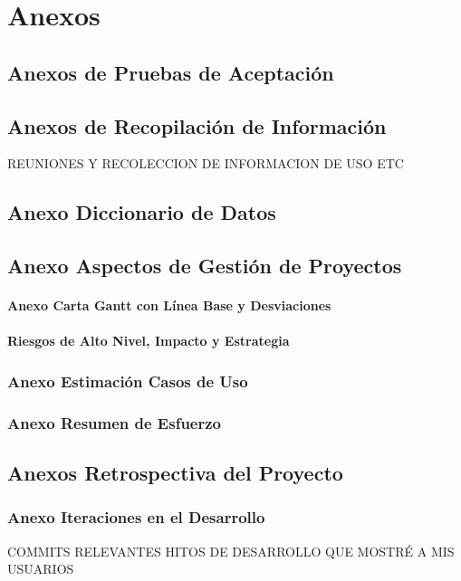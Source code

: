 \chapter{Anexos}

\section{Anexos de Pruebas de Aceptación}

\section{Anexos de Recopilación de Información}
REUNIONES Y RECOLECCION DE INFORMACION DE USO ETC

\section{Anexo Diccionario de Datos}

\section{Anexo Aspectos de Gestión de Proyectos}

\subsubsection{Anexo Carta Gantt con Línea Base y Desviaciones}

\subsubsection{Riesgos de Alto Nivel, Impacto y Estrategia}
	
\subsection{Anexo Estimación Casos de Uso}


\subsection{Anexo Resumen de Esfuerzo}
 

\section{Anexos Retrospectiva del Proyecto}

\subsection{Anexo Iteraciones en el Desarrollo}

COMMITS RELEVANTES HITOS DE DESARROLLO QUE MOSTRÉ A MIS USUARIOS